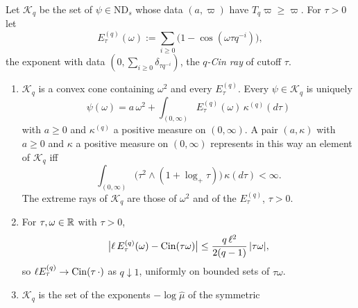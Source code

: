 \begin{proposition}
\label{prop:strata-cylinder-coordinates-q-cin}
\leanok
{}
Let $\mathcal{K}_q$ be the set of $\psi \in \mathrm{ND}_s$ whose data $(a, \varpi)$ have
$T_q\varpi \ge \varpi$. For $\tau > 0$ let
\[
  E^{(q)}_\tau(\omega) := \sum_{i \ge 0}\bigl(1 - \cos(\omega\tau q^{-i})\bigr),
\]
the exponent with data $(0, \sum_{i \ge 0}\delta_{\tau q^{-i}})$, the \emph{$q$-Cin ray} of
cutoff $\tau$.
\begin{enumerate}
\item $\mathcal{K}_q$ is a convex cone containing $\omega^2$ and every $E^{(q)}_\tau$. Every
$\psi \in \mathcal{K}_q$ is uniquely
\[
  \psi(\omega) = a\,\omega^2 + \int_{(0,\infty)}E^{(q)}_\tau(\omega)\,\kappa^{(q)}(d\tau)
\]
with $a \ge 0$ and $\kappa^{(q)}$ a positive measure on $(0,\infty)$. A pair $(a, \kappa)$ with
$a \ge 0$ and $\kappa$ a positive measure on $(0,\infty)$ represents in this way an element of
$\mathcal{K}_q$ iff
\[
  \int_{(0,\infty)}\bigl(\tau^2 \wedge (1 + \log_+\tau)\bigr)\,\kappa(d\tau) < \infty .
\]
The extreme rays of $\mathcal{K}_q$ are those of $\omega^2$ and of the $E^{(q)}_\tau$, $\tau > 0$.
\item For $\tau, \omega \in \mathbb{R}$ with $\tau > 0$,
\[
  \bigl|\ell\,E^{(q)}_\tau(\omega) - \operatorname{Cin}(\tau\omega)\bigr| \le \frac{q\,\ell^2}{2(q - 1)}\,|\tau\omega|,
\]
so $\ell E^{(q)}_\tau \to \operatorname{Cin}(\tau\,\cdot)$ as $q \downarrow 1$, uniformly on bounded sets of
$\tau\omega$.
\item $\mathcal{K}_q$ is the set of the exponents $-\log\widehat\mu$ of the symmetric

\end{enumerate}
\end{proposition}

